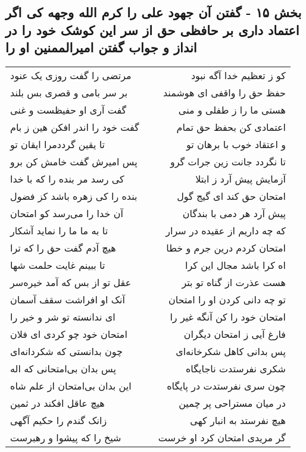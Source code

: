 \begin{center}
\section*{بخش ۱۵ - گفتن آن جهود علی را کرم الله وجهه کی اگر اعتماد داری بر حافظی حق از سر این کوشک خود را در انداز و جواب گفتن  امیرالممنین او را}
\label{sec:sh015}
\begin{longtable}{l p{0.5cm} r}
مرتضی را گفت روزی یک عنود
&&
کو ز تعظیم خدا آگه نبود
\\
بر سر بامی و قصری بس بلند
&&
حفظ حق را واقفی ای هوشمند
\\
گفت آری او حفیظست و غنی
&&
هستی ما را ز طفلی و منی
\\
گفت خود را اندر افکن هین ز بام
&&
اعتمادی کن بحفظ حق تمام
\\
تا یقین گرددمرا ایقان تو
&&
و اعتقاد خوب با برهان تو
\\
پس امیرش گفت خامش کن برو
&&
تا نگردد جانت زین جرات گرو
\\
کی رسد مر بنده را که با خدا
&&
آزمایش پیش آرد ز ابتلا
\\
بنده را کی زهره باشد کز فضول
&&
امتحان حق کند ای گیج گول
\\
آن خدا را می‌رسد کو امتحان
&&
پیش آرد هر دمی با بندگان
\\
تا به ما ما را نماید آشکار
&&
که چه داریم از عقیده در سرار
\\
هیچ آدم گفت حق را که ترا
&&
امتحان کردم درین جرم و خطا
\\
تا ببینم غایت حلمت شها
&&
اه کرا باشد مجال این کرا
\\
عقل تو از بس که آمد خیره‌سر
&&
هست عذرت از گناه تو بتر
\\
آنک او افراشت سقف آسمان
&&
تو چه دانی کردن او را امتحان
\\
ای ندانسته تو شر و خیر را
&&
امتحان خود را کن آنگه غیر را
\\
امتحان خود چو کردی ای فلان
&&
فارغ آیی ز امتحان دیگران
\\
چون بدانستی که شکردانه‌ای
&&
پس بدانی کاهل شکرخانه‌ای
\\
پس بدان بی‌امتحانی که اله
&&
شکری نفرستدت ناجایگاه
\\
این بدان بی‌امتحان از علم شاه
&&
چون سری نفرستدت در پایگاه
\\
هیچ عاقل افکند در ثمین
&&
در میان مستراحی پر چمین
\\
زانک گندم را حکیم آگهی
&&
هیچ نفرستد به انبار کهی
\\
شیخ را که پیشوا و رهبرست
&&
گر مریدی امتحان کرد او خرست

\end{longtable}
\end{center}
